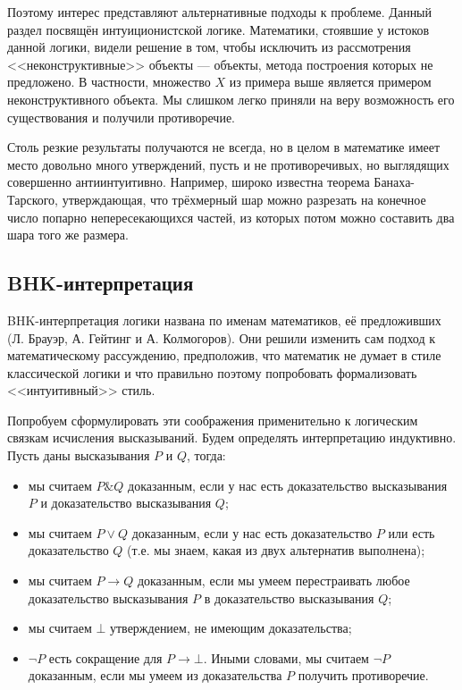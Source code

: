 Поэтому интерес представляют альтернативные подходы к проблеме. Данный раздел посвящён 
интуиционистской логике. Математики, стоявшие у истоков данной логики, видели решение в том,
чтобы исключить из рассмотрения <<неконструктивные>> объекты --- объекты, метода построения
которых не предложено. В частности, множество $X$ из примера выше является примером 
неконструктивного объекта. Мы слишком легко приняли на веру возможность его существования и
получили противоречие.

Столь резкие результаты получаются не всегда, но в целом в математике имеет место 
довольно много утверждений, пусть и не противоречивых, но выглядящих совершенно антиинтуитивно.
Например, широко известна теорема Банаха-Тарского, утверждающая, что трёхмерный шар можно 
разрезать на конечное число попарно непересекающихся частей, из которых потом можно составить
два шара того же размера.

\subsection*{BHK-интерпретация}

BHK-интерпретация логики названа по именам математиков, её предложивших 
(Л. Брауэр, А. Гейтинг и А. Колмогоров). 
Они решили изменить сам подход к математическому рассуждению, предположив,
что математик не думает в стиле классической логики и что 
правильно поэтому попробовать формализовать <<интуитивный>> стиль.

Попробуем сформулировать эти соображения применительно к 
логическим связкам исчисления высказываний. Будем определять интерпретацию индуктивно. 
Пусть даны высказывания $P$ и $Q$, тогда:

\begin{itemize}
\item мы считаем $P \& Q$ доказанным, если у нас есть доказательство 
высказывания $P$ и доказательство высказывания $Q$;
\item мы считаем $P \vee Q$ доказанным, если у нас есть доказательство $P$ или 
есть доказательство $Q$ (т.е. мы знаем, какая из двух альтернатив выполнена);
\item мы считаем $P \rightarrow Q$ доказанным, если мы умеем перестраивать любое 
доказательство высказывания $P$ в доказательство высказывания $Q$;
\item мы считаем $\bot$ утверждением, не имеющим доказательства;
\item $\neg P$ есть сокращение для $P \rightarrow \bot$. Иными словами, мы считаем 
$\neg P$ доказанным, если мы умеем из доказательства $P$ получить противоречие.
\end{itemize}

